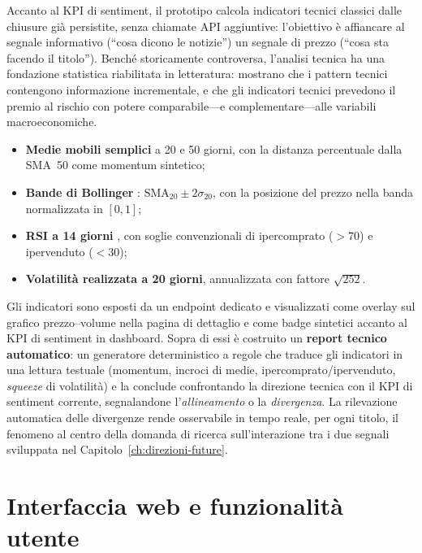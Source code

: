 Accanto al KPI di sentiment, il prototipo calcola indicatori tecnici classici dalle chiusure già persistite, senza chiamate API aggiuntive: l'obiettivo è affiancare al segnale informativo (``cosa dicono le notizie'') un segnale di prezzo (``cosa sta facendo il titolo'').
Benché storicamente controversa, l'analisi tecnica ha una fondazione statistica riabilitata in letteratura: \textcite{lo2000foundations} mostrano che i pattern tecnici contengono informazione incrementale, e \textcite{neely2014forecasting} che gli indicatori tecnici prevedono il premio al rischio con potere comparabile---e complementare---alle variabili macroeconomiche.

\begin{itemize}
  \item \textbf{Medie mobili semplici} a 20 e 50 giorni, con la distanza percentuale dalla SMA~50 come momentum sintetico;
  \item \textbf{Bande di Bollinger} \parencite{bollinger2001bollinger}: $\text{SMA}_{20} \pm 2\sigma_{20}$, con la posizione del prezzo nella banda normalizzata in $[0,1]$;
  \item \textbf{RSI a 14 giorni} \parencite{wilder1978new}, con soglie convenzionali di ipercomprato ($>70$) e ipervenduto ($<30$);
  \item \textbf{Volatilità realizzata a 20 giorni}, annualizzata con fattore $\sqrt{252}$.
\end{itemize}

Gli indicatori sono esposti da un endpoint dedicato e visualizzati come overlay sul grafico prezzo--volume nella pagina di dettaglio e come badge sintetici accanto al KPI di sentiment in dashboard.
Sopra di essi è costruito un \textbf{report tecnico automatico}: un generatore deterministico a regole che traduce gli indicatori in una lettura testuale (momentum, incroci di medie, ipercomprato/ipervenduto, \textit{squeeze} di volatilità) e la conclude confrontando la direzione tecnica con il KPI di sentiment corrente, segnalandone l'\emph{allineamento} o la \emph{divergenza}.
La rilevazione automatica delle divergenze rende osservabile in tempo reale, per ogni titolo, il fenomeno al centro della domanda di ricerca sull'interazione tra i due segnali \parencite{brock1992simple} sviluppata nel Capitolo~\ref{ch:direzioni-future}.

\section{Interfaccia web e funzionalità utente}

